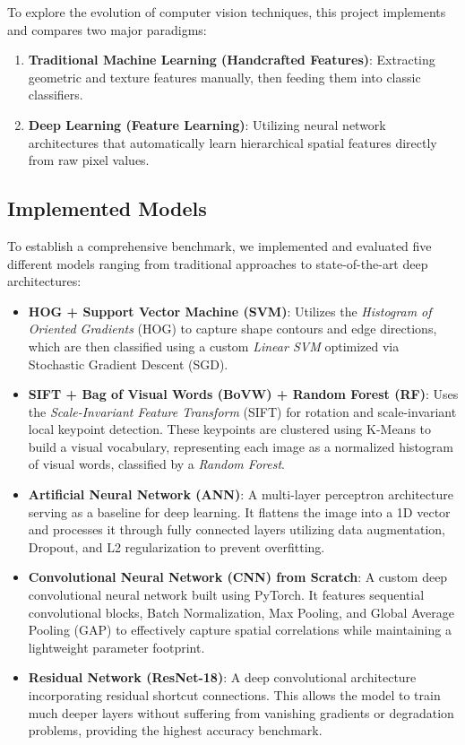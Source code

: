 \documentclass[12pt,a4paper]{article}
\begin{document}
To explore the evolution of computer vision techniques, this project implements and compares two major paradigms:
\begin{enumerate}
    \item \textbf{Traditional Machine Learning (Handcrafted Features)}: Extracting geometric and texture features manually, then feeding them into classic classifiers.
    \item \textbf{Deep Learning (Feature Learning)}: Utilizing neural network architectures that automatically learn hierarchical spatial features directly from raw pixel values.
\end{enumerate}

\subsection{Implemented Models}
To establish a comprehensive benchmark, we implemented and evaluated five different models ranging from traditional approaches to state-of-the-art deep architectures:
\begin{itemize}
    \item \textbf{HOG + Support Vector Machine (SVM)}: Utilizes the \textit{Histogram of Oriented Gradients} (HOG) to capture shape contours and edge directions, which are then classified using a custom \textit{Linear SVM} optimized via Stochastic Gradient Descent (SGD).
    \item \textbf{SIFT + Bag of Visual Words (BoVW) + Random Forest (RF)}: Uses the \textit{Scale-Invariant Feature Transform} (SIFT) for rotation and scale-invariant local keypoint detection. These keypoints are clustered using K-Means to build a visual vocabulary, representing each image as a normalized histogram of visual words, classified by a \textit{Random Forest}.
    \item \textbf{Artificial Neural Network (ANN)}: A multi-layer perceptron architecture serving as a baseline for deep learning. It flattens the image into a 1D vector and processes it through fully connected layers utilizing data augmentation, Dropout, and L2 regularization to prevent overfitting.
    \item \textbf{Convolutional Neural Network (CNN) from Scratch}: A custom deep convolutional neural network built using PyTorch. It features sequential convolutional blocks, Batch Normalization, Max Pooling, and Global Average Pooling (GAP) to effectively capture spatial correlations while maintaining a lightweight parameter footprint.
    \item \textbf{Residual Network (ResNet-18)}: A deep convolutional architecture incorporating residual shortcut connections. This allows the model to train much deeper layers without suffering from vanishing gradients or degradation problems, providing the highest accuracy benchmark.
\end{itemize}
\end{document}
